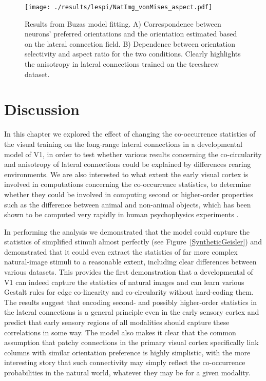 \begin{figure}
	\centering
        \texttt{[image: ./results/lespi/NatImg\_vonMises\_aspect.pdf]}
	\caption[Results from Buzas model fitting.]{Results from Buzas
      model fitting. A) Correspondence between neurons' preferred
      orientations and the orientation estimated based on the lateral
      connection field. B) Dependence between orientation selectivity
      and aspect ratio for the two conditions. Clearly highlights the
      anisotropy in lateral connections trained on the treeshrew
      dataset.}
	\label{NatImgvonMisesAspect}
\end{figure}

\section{Discussion}

In this chapter we explored the effect of changing the co-occurrence
statistics of the visual training on the long-range lateral
connections in a developmental model of V1, in order to test whether
various results concerning the co-circularity \citep{Hunt2011} and
anisotropy of lateral connections \citep{Bosking1997} could be
explained by differences rearing environments. We are also interested
to what extent the early visual cortex is involved in computations
concerning the co-occurrence statistics, to determine whether they
could be involved in computing second or higher-order properties such
as the difference between animal and non-animal objects, which has
been shown to be computed very rapidly in human psychophysics
experiments \citep{Serre2007b}.

In performing the analysis we demonstrated that the model could
capture the statistics of simplified stimuli almost perfectly (see
Figure~\ref{SyntheticGeisler}) and demonstrated that it could even
extract the statistics of far more complex natural-image stimuli to a
reasonable extent, including clear differences between various
datasets. This provides the first demonstration that a developmental
of V1 can indeed capture the statistics of natural images and can
learn various Gestalt rules for edge co-linearity and co-circularity
without hard-coding them. The results suggest that encoding second-
and possibly higher-order statistics in the lateral connections is a
general principle even in the early sensory cortex and predict that
early sensory regions of all modalities should capture these
correlations in some way. The model also makes it clear that the
common assumption that patchy connections in the primary visual cortex
specifically link columns with similar orientation preference is
highly simplistic, with the more interesting story that such
connectivity may simply reflect the co-occurrence probabilities in the
natural world, whatever they may be for a given modality.

